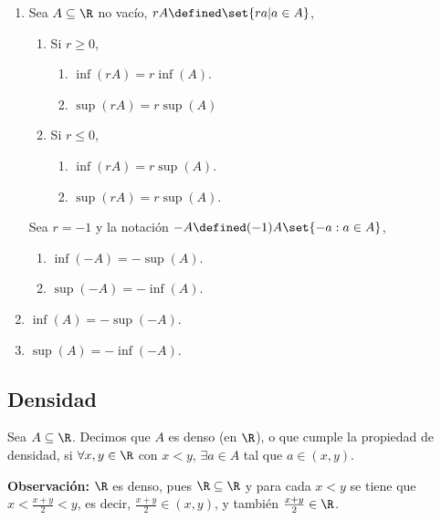 \begin{enumerate}[label=\alph*)]
  \item Sea $A\subseteq \R$ no vacío, $rA \defined \set{r a| a\in A}$,
  \begin{enumerate}[label=\Roman*)]
    \item Si $r\geq 0$,
    \begin{enumerate}[label=\roman*)]
      \item $\inf(r A) = r\inf(A)$.
      \item $\sup(r A) = r\sup(A)$
    \end{enumerate}
    \item Si $r\leq 0$,
    \begin{enumerate}[label=\roman*)]
      \item $\inf(rA)=r\sup(A)$.
      \item $\sup(rA)=r\sup(A)$.
    \end{enumerate}
  \end{enumerate}
   Sea $r=-1$ y la notación $-A\defined (-1)A\set{-a:a\in A}$,
  \begin{enumerate}[label=\roman*)]
  \item $\inf(-A) = -\sup(A)$.
  \item $\sup(-A) = -\inf(A)$.
  \end{enumerate}
  
  \item $\inf(A)=-\sup(-A)$.
  \item $\sup(A)=-\inf(-A)$.
  
\end{enumerate}

\subsection*{Densidad}

 Sea $A\subseteq \R$. Decimos que $A$ es denso (en $\R$), o que cumple la propiedad de densidad, si $\forall x,y \in \R$ con $x<y$, $\exists a\in A$ tal que $a\in (x, y)$.

\textbf{Observación:} $\R$ es denso, pues $\R\subseteq \R$ y para cada $x<y$ se tiene que $x<\frac{x+y}{2}<y$, es decir, $\frac{x+y}{2}\in (x, y)$, y también $\frac{x+y}{2}\in \R$.